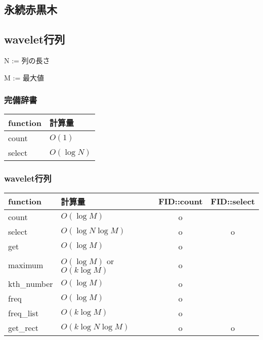 \subsection{永続赤黒木}

\subsection{wavelet行列}
N := 列の長さ\par
M := 最大値\\
\subsubsection{完備辞書}
\begin{table} [htb]
  \begin{tabular} { |l|l| } \hline
    function & 計算量 \\ \hline
    count & $O(1)$ \\ \hline
    select & $O(\log N)$ \\ \hline
  \end{tabular}
\end{table}

\subsubsection{wavelet行列}
\begin{table} [htb]
  \begin{tabular} { |l|l|c|c| } \hline
    function & 計算量 & FID::count & FID::select\\ \hline
    count & $O(\log M)$ & o & \\ \hline
    select & $O(\log N \log M)$ & o & o \\ \hline
    get & $O(\log M)$ & o & \\ \hline
    maximum & $O(\log M)$ or $O(k\log M)$ & o & \\ \hline
    kth\_number & $O(\log M)$ & o & \\ \hline
    freq & $O(\log M)$ & o & \\ \hline
    freq\_list & $O(k\log M)$ & o & \\ \hline
    get\_rect & $O(k\log N \log M)$ & o & o \\ \hline
  \end{tabular}
\end{table}

